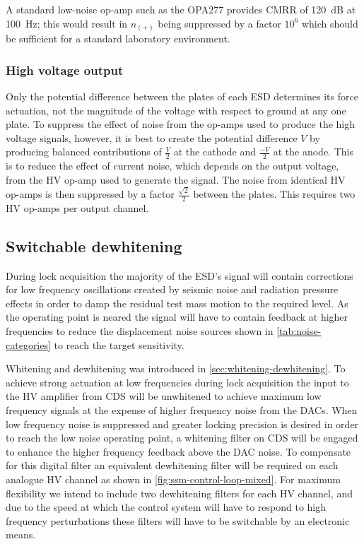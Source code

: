 A standard low-noise op-amp such as the OPA277 provides \gls{CMRR} of \SI{120}{\deci\bel} at \SI{100}{\hertz}; this would result in $n_{\left(+\right)}$ being suppressed by a factor $10^6$ which should be sufficient for a standard laboratory environment.

\subsubsection{High voltage output}
Only the potential difference between the plates of each \gls{ESD} determines its force actuation, not the magnitude of the voltage with respect to ground at any one plate. To suppress the effect of noise from the op-amps used to produce the high voltage signals, however, it is best to create the potential difference $V$ by producing balanced contributions of $\frac{V}{2}$ at the cathode and $\frac{-V}{2}$ at the anode. This is to reduce the effect of current noise, which depends on the output voltage, from the \gls{HV} op-amp used to generate the signal. The noise from identical \gls{HV} op-amps is then suppressed by a factor $\frac{\sqrt{2}}{2}$ between the plates. This requires two \gls{HV} op-amps per output channel.

\subsection{Switchable dewhitening}
During lock acquisition the majority of the \gls{ESD}'s signal will contain corrections for low frequency oscillations created by seismic noise and radiation pressure effects in order to damp the residual test mass motion to the required level. As the operating point is neared the signal will have to contain feedback at higher frequencies to reduce the displacement noise sources shown in \cref{tab:noise-categories} to reach the target sensitivity.

Whitening and dewhitening was introduced in \cref{sec:whitening-dewhitening}. To achieve strong actuation at low frequencies during lock acquisition the input to the \gls{HV} amplifier from \gls{CDS} will be unwhitened to achieve maximum low frequency signals at the expense of higher frequency noise from the \glspl{DAC}. When low frequency noise is suppressed and greater locking precision is desired in order to reach the low noise operating point, a whitening filter on \gls{CDS} will be engaged to enhance the higher frequency feedback above the \gls{DAC} noise. To compensate for this digital filter an equivalent dewhitening filter will be required on each analogue \gls{HV} channel as shown in \cref{fig:ssm-control-loop-mixed}. For maximum flexibility we intend to include two dewhitening filters for each \gls{HV} channel, and due to the speed at which the control system will have to respond to high frequency perturbations these filters will have to be switchable by an electronic means.

